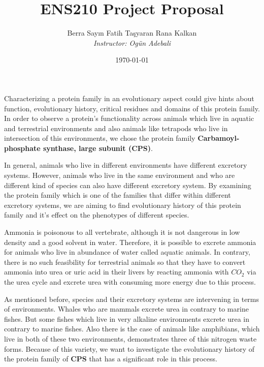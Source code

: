 \documentclass[a4paper]{article}
\begin{document}
\title{\textbf{\huge{ENS210 Project Proposal}}}
\author{\textbf\large{Berra Say{\i}n \vspace{3ex} Fatih Ta\c{s}yaran \vspace{3ex} Rana Kalkan} \\ \vspace{-4ex} \textit{Instructor: Ogün Adebali}}
\date{\today}
\maketitle

Characterizing a protein family in an evolutionary aspect could give hints about function, evolutionary history, critical residues and domains of this protein family. In order to observe a protein's functionality across animals which live in aquatic and terrestrial environments and also animals like tetrapods who live in intersection of this environments, we chose the protein family \textbf{Carbamoyl-phosphate synthase, large subunit (CPS)}.
\par
\smallskip
In general, animals who live in different environments have different excretory systems. However, animals who live in the same environment and who are different kind of species can also have different excretory system. By examining the protein family which is one of the families that differ within different excretory systems, we are aiming to find evolutionary history of this protein family and it's effect on the phenotypes of different species.
\par
\smallskip
Ammonia is poisonous to all vertebrate, although it is not dangerous in low density and a good solvent in water. Therefore, it is possible to excrete ammonia for animals who  live in abundance of water called aquatic animals. In contrary, there is no such feasibility for terrestrial animals so that they have to convert ammonia into urea or uric acid in their livers by reacting ammonia with $CO_2$ via the urea cycle and excrete urea with consuming more energy due to this process.
\par
\smallskip
As mentioned before, species and their excretory systems are intervening in terms of environments. Whales who are mammals excrete urea in contrary to marine fishes. But some fishes which live in very alkaline environments excrete urea in contrary to marine fishes. Also there is the case of animals like amphibians, which live in both of these two environments, demonstrates three of this nitrogen waste forms. Because of this variety, we want to investigate the evolutionary history of the protein family of \textbf{CPS} that has a significant role in this process. 
\end{document}
